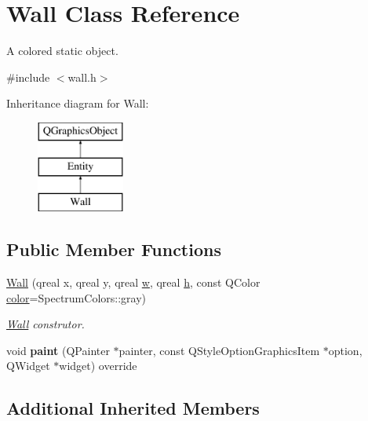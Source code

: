 \hypertarget{class_wall}{}\section{Wall Class Reference}
\label{class_wall}


A colored static object.  




{\ttfamily \#include $<$wall.\+h$>$}

Inheritance diagram for Wall\+:\begin{figure}[H]
\begin{center}
\leavevmode
\includegraphics[height=3.000000cm]{class_wall}
\end{center}
\end{figure}
\subsection*{Public Member Functions}
\begin{DoxyCompactItemize}
\item 
\hyperlink{class_wall_aa5301fede4692065ac2e3a36e13390e9}{Wall} (qreal x, qreal y, qreal \hyperlink{class_entity_a351a26475f8c124429a638483e95fa8e}{w}, qreal \hyperlink{class_entity_a639fea375adab80851778acb51757fb8}{h}, const Q\+Color \hyperlink{class_entity_ad14bf88ca550e2e5b13438a3faf545e6}{color}=Spectrum\+Colors\+::gray)
\begin{DoxyCompactList}\small\item\em \hyperlink{class_wall}{Wall} construtor. \end{DoxyCompactList}\item 
\mbox{\label{class_wall_a5b85bd1704a73cf320767c8a94735436}} 
void {\bfseries paint} (Q\+Painter $\ast$painter, const Q\+Style\+Option\+Graphics\+Item $\ast$option, Q\+Widget $\ast$widget) override
\end{DoxyCompactItemize}
\subsection*{Additional Inherited Members}


